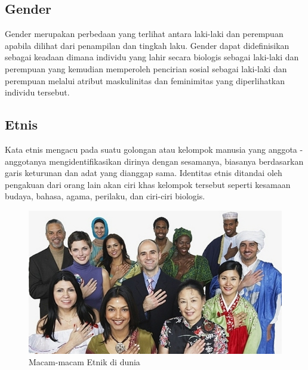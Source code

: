 \subsection{Gender}
Gender merupakan perbedaan yang terlihat antara laki-laki dan perempuan apabila dilihat dari penampilan 
dan tingkah laku. Gender dapat didefinisikan sebagai keadaan dimana individu yang lahir secara biologis 
sebagai laki-laki dan perempuan yang kemudian memperoleh pencirian sosial sebagai laki-laki dan perempuan 
melalui atribut maskulinitas dan feminimitas yang diperlihatkan individu tersebut.

\subsection{Etnis}
Kata etnis mengacu pada suatu golongan atau kelompok manusia yang anggota - anggotanya mengidentifikasikan 
dirinya dengan sesamanya, biasanya berdasarkan garis keturunan dan adat yang dianggap sama. Identitas 
etnis ditandai oleh pengakuan dari orang lain akan ciri khas kelompok tersebut seperti kesamaan budaya, 
bahasa, agama, perilaku, dan ciri-ciri biologis.
\begin{figure} [H] \centering
    \includegraphics[scale=0.6]{gambar/etnik.png}
    \caption{Macam-macam Etnik di dunia}
    \label{fig:Etnik}
\end{figure}

